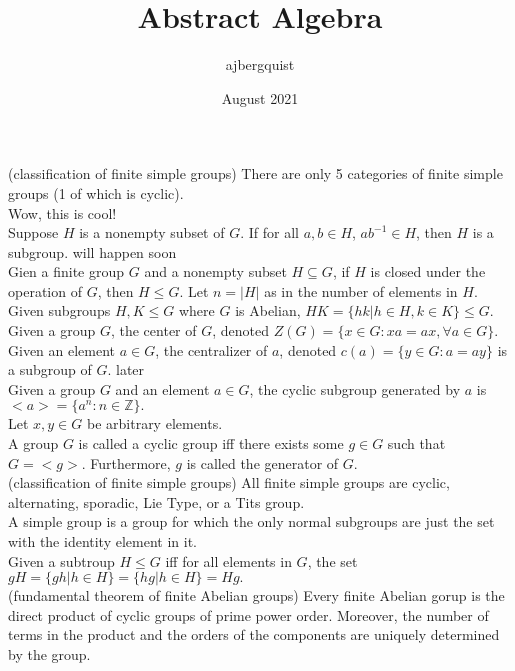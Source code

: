 \documentclass{article}
\title{Abstract Algebra}
\author{ajbergquist }
\date{August 2021}
\newcommand{\Z}{\mathbb{Z}}
\begin{document}
(classification of finite simple groups) There are only 5 categories of finite simple groups (1 of which is cyclic).\\
 Wow, this is cool!\\
 Suppose $H$ is a nonempty subset of $G$. If for all $a,b\in H$, $ab^{-1}\in H$, then $H$ is a subgroup.
 will happen soon\\

 Gien a finite group $G$ and a nonempty subset $H\subseteq G$, if $H$ is closed under the operation of $G$, then $H\le G$. 
 Let $n = |H|$ as in the number of elements in $H$.  \\

 Given subgroups $H,K\le G$ where $G$ is Abelian, $HK = \{hk |h\in H,k\in K\}\le G$.\\

 Given a group $G$, the center of $G$, denoted $Z(G) = \{x\in G: xa = ax,\forall a\in G\}$.\\
 Given an element $a\in G$, the centralizer of $a$, denoted $c(a) = \{y\in G : a = ay\}$ is a subgroup of $G$.
 later\\


 Given a group $G$ and an element $a\in G$, the cyclic subgroup generated by $a$ is $<a> = \{a^n:n\in \Z\}.$\\
 Let $x,y\in G$ be arbitrary elements. \\


 A group $G$ is called a cyclic group iff there exists some $g\in G$ such that $G = <g>$. Furthermore, $g$ is called the generator of $G$. \\

 (classification of finite simple groups) All finite simple groups are cyclic, alternating, sporadic, Lie Type, or a Tits group. \\
 A simple group is a group for which the only normal subgroups are just the set with the identity element in it. \\
 Given a subtroup $H\le G$ iff for all elements in $G$, the set $gH = \{gh | h \in H\} = \{hg | h \in H\} = Hg.$\\

 (fundamental theorem of finite Abelian groups) Every finite Abelian gorup is the direct product of cyclic groups of prime power order. Moreover, the number of terms in the product and the orders of the components are uniquely determined by the group.\\
\end{document}
